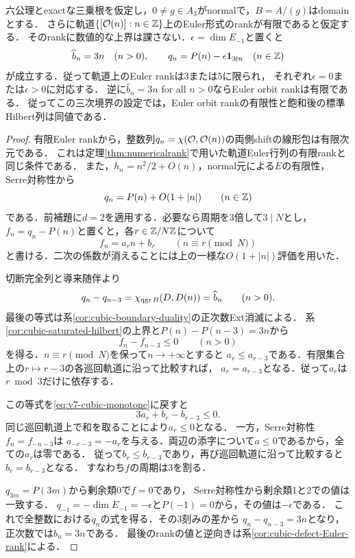 \documentclass[11pt,a4paper]{ltjsarticle}
\begin{document}
\begin{proposition}
\label{prop:v7-finite-rank-cubic-euler}
六公理とexactな三乗根を仮定し，$0\ne g\in A_3$がnormalで，$B=A/(g)$はdomainとする．
さらに軌道$\{[\mathcal O(n)]:n\in\mathbb Z\}$上のEuler形式のrankが有限であると仮定する．
そのrankに数値的な上界は課さない．$\epsilon=\dim E_{-1}$と置くと
\[
 \widehat b_n=3n\quad(n>0),\qquad
 q_n=P(n)-\epsilon\mathbf1_{3\nmid n}\quad(n\in\mathbb Z)
\]
が成立する．従って軌道上のEuler rankは$3$または$5$に限られ，
それぞれ$\epsilon=0$または$\epsilon>0$に対応する．
逆に$\widehat b_n=3n$ for all $n>0$ならEuler orbit rankは有限である．
従ってこの三次境界の設定では，Euler orbit rankの有限性と飽和後の標準Hilbert列は同値である．
\end{proposition}
\begin{proof}
有限Euler rankから，整数列$q_n=\chi(\mathcal O,\mathcal O(n))$の両側shiftの線形包は有限次元である．
これは定理\ref{thm:numericalrank}で用いた軌道Euler行列の有限rankと同じ条件である．
また，$h_n=n^2/2+O(n)$，normal元による$E$の有限性，Serre対称性から
\[
 q_n=P(n)+O(1+|n|)\qquad(n\in\mathbb Z)
\]
である．前補題に$d=2$を適用する．必要なら周期を3倍して$3\mid N$とし，
$f_n=q_n-P(n)$と置くと，各$r\in\mathbb Z/N\mathbb Z$について
\[
 f_n=a_rn+b_r\qquad(n\equiv r\pmod N)
\]
と書ける．二次の係数が消えることには上の一様な$O(1+|n|)$評価を用いた．

切断完全列と導来随伴より
\[
 q_n-q_{n-3}
 =\chi_{\operatorname{qgr} B}(D,D(n))
 =\widehat b_n\qquad(n>0).
\]
最後の等式は系\ref{cor:cubic-boundary-duality}の正次数Ext消滅による．
系\ref{cor:cubic-saturated-hilbert}の上界と$P(n)-P(n-3)=3n$から
\begin{equation}\label{eq:v7-cubic-monotone}
 f_n-f_{n-3}\leq0\qquad(n>0)
\end{equation}
を得る．$n\equiv r\pmod N$を保って$n\to+\infty$とすると
$a_r\leq a_{r-3}$である．有限集合上の$r\mapsto r-3$の各巡回軌道に沿って比較すれば，
$a_r=a_{r-3}$となる．従って$a_r$は$r\bmod3$だけに依存する．

この等式を\eqref{eq:v7-cubic-monotone}に戻すと
\[
 3a_r+b_r-b_{r-3}\leq0.
\]
同じ巡回軌道上で和を取ることにより$a_r\leq0$となる．
一方，Serre対称性$f_n=f_{-n-3}$は
$a_{-r-3}=-a_r$を与える．両辺の添字について$a\leq0$であるから，全ての$a_r$は零である．
従って$b_r\leq b_{r-3}$であり，再び巡回軌道に沿って比較すると$b_r=b_{r-3}$となる．
すなわち$f$の周期は3を割る．

$q_{3m}=P(3m)$から剰余類0で$f=0$であり，
Serre対称性から剰余類1と2での値は一致する．
$q_{-1}=-\dim E_{-1}=-\epsilon$と$P(-1)=0$から，その値は$-\epsilon$である．
これで全整数における$q_n$の式を得る．その3刻みの差から
$q_n-q_{n-3}=3n$となり，正次数では$\widehat b_n=3n$である．
最後のrankの値と逆向きは系\ref{cor:cubic-defect-Euler-rank}による．
\end{proof}
\end{document}
